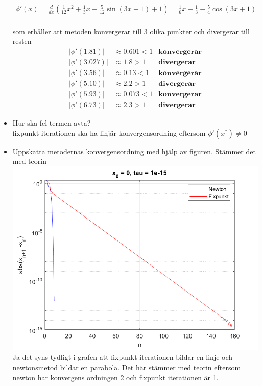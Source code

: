 \documentclass{assignment}
\begin{document}
\begin{itemize}
    \begin{align}
        \phi ' (x)=\frac{d}{dx} (\frac{1}{12}x^2+\frac{1}{3}x-\frac{5}{12}\sin(3x+1)+1)
        =\frac{1}{6}x+\frac{1}{3}-\frac{5}{4}\cos(3x+1)
    \end{align}
    \\som erhåller att metoden konvergerar till 3 olika punkter och divergerar till resten
    \begin{align*}
        |\phi ' (1.81)| & \approx 0.601 < 1 &\textbf{konvergerar}
        \\ |\phi ' (3.027)| & \approx 1.8 > 1 &\textbf{divergerar}
        \\ |\phi ' (3.56)| & \approx 0.13 < 1 &\textbf{konvergerar}
        \\ |\phi ' (5.10)| & \approx 2.2 > 1 &\textbf{divergerar}
        \\ |\phi ' (5.93)| & \approx 0.073 < 1& \textbf{konvergerar}
        \\ |\phi ' (6.73)| & \approx 2.3 > 1 &\textbf{divergerar}
    \end{align*}

    \item Hur ska fel termen avta?
    \\fixpunkt iterationen ska ha linjär konvergensordning eftersom 
    $\phi ' (x^{*})\neq 0$
    \newpage
    \item Uppskatta metodernas konvergensordning med hjälp av figuren. Stämmer det med
    teorin
    \\
    \includegraphics[]{assets/konvplot1.png}
    Ja det syns tydligt i grafen att fixpunkt iterationen bildar en linje
    och newtonsmetod bildar en parabola. 
    Det här stämmer med teorin eftersom newton har konvergens ordningen
    2 och fixpunkt iterationen är 1.
\end{itemize}
\end{document}
